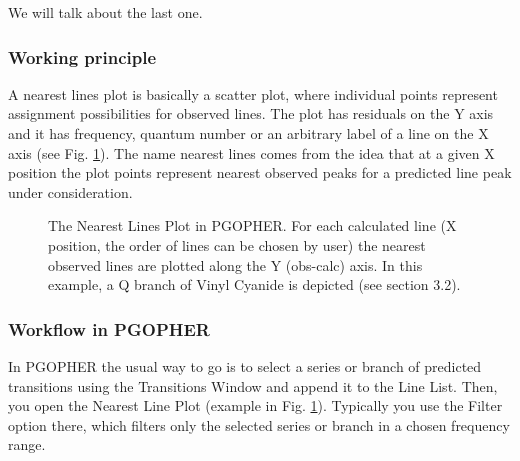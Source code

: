\documentclass[11pt]{article}
\begin{document}
We will talk about the last one. 

\subsubsection{Working principle}

A nearest lines plot is basically a scatter plot, where individual points represent assignment possibilities for observed lines. The plot has residuals on the Y axis and it has frequency, quantum number or an arbitrary label of a line on the X axis (see Fig. \ref{fig:nlp_ex}). The name nearest lines comes from the idea that at a given X position the plot points represent nearest observed peaks for a predicted line peak under consideration. 

\begin{figure}[h]
\caption{\small The Nearest Lines Plot in PGOPHER. For each calculated line (X position, the order of lines can be chosen by user) the nearest observed lines are plotted along the Y (obs-calc) axis. In this example, a Q branch of Vinyl Cyanide is depicted (see section 3.2).}
\label{fig:nlp_ex}
\end{figure}

\subsubsection{Workflow in PGOPHER}

In PGOPHER the usual way to go is to select a series or branch of predicted transitions using the Transitions Window and append it to the Line List. Then, you open the Nearest Line Plot (example in Fig. \ref{fig:nlp_ex}). Typically you use the Filter option there, which filters only the selected series or branch in a chosen frequency range. 
\end{document}
